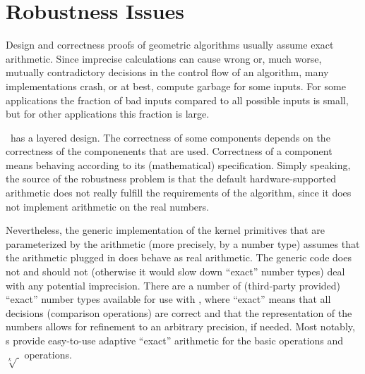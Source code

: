 
\chapter{Robustness Issues}
\label{chap:robustness}

Design and correctness proofs of geometric algorithms usually assume exact
arithmetic. Since imprecise calculations can cause wrong or, much worse,
mutually contradictory decisions in the control flow of an algorithm, many
implementations crash, or at best, compute garbage for some inputs. For
some applications the fraction of bad inputs compared to all possible
inputs is small, but for other applications this fraction is large.

\cgal\ has a layered design. The correctness of some components depends
on the correctness of the componenents that are used. Correctness of
a component means behaving according to its (mathematical) specification.
Simply speaking, the source of the robustness problem is that the default
hardware-supported arithmetic does not really fulfill the requirements of 
the algorithm, since it does not implement arithmetic on the real numbers.

Nevertheless, the generic implementation of the kernel primitives that are 
parameterized by the arithmetic (more precisely, by a number type)
assumes that the arithmetic plugged in does behave as real arithmetic.
The generic code does not and should not (otherwise it would slow down 
``exact'' number types) deal with any potential imprecision. There are
a number of (third-party provided) ``exact'' number types available for use
with \cgal, where ``exact'' means
that all decisions (comparison operations) are correct and that the
representation of the numbers allows for refinement to an arbitrary precision, 
if needed. Most notably, s provide easy-to-use adaptive 
``exact'' arithmetic for the basic operations and $\sqrt[k]{\ }$ operations.


